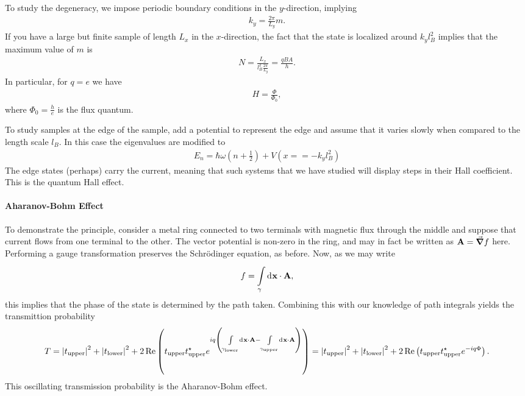 To study the degeneracy, we impose periodic boundary conditions in the $y$-direction, implying
\begin{align*}
	k_{y} = \frac{2\pi}{L_{y}}m.
\end{align*}
If you have a large but finite sample of length $L_{x}$ in the $x$-direction, the fact that the state is localized around $k_{y}l_{B}^{2}$ implies that the maximum value of $m$ is
\begin{align*}
	N = \frac{L_{x}}{l_{B}^{2}\frac{2\pi}{L_{y}}} = \frac{qBA}{h}.
\end{align*}
In particular, for $q = e$ we have
\begin{align*}
	H = \frac{\Phi}{\Phi_{0}},
\end{align*}
where $\Phi_{0} = \frac{h}{e}$ is the flux quantum.

To study samples at the edge of the sample, add a potential to represent the edge and assume that it varies slowly when compared to the length scale $l_{B}$. In this case the eigenvalues are modified to
\begin{align*}
	E_{n} = \hbar\omega(n + \frac{1}{2}) + V(x = = -k_{y}l_{B}^{2})
\end{align*}
The edge states (perhaps) carry the current, meaning that such systems that we have studied will display steps in their Hall coefficient. This is the quantum Hall effect.

\paragraph{Aharanov-Bohm Effect}
To demonstrate the principle, consider a metal ring connected to two terminals with magnetic flux through the middle and suppose that current flows from one terminal to the other. The vector potential is non-zero in the ring, and may in fact be written as $\vb{A} = \grad{f}$ here. Performing a gauge transformation preserves the Schrödinger equation, as before. Now, as we may write
\begin{align*}
	f = \int\limits_{\gamma}^{}\dd[]{\vb{x}}\cdot\vb{A},
\end{align*}
this implies that the phase of the state is determined by the path taken. Combining this with our knowledge of path integrals yields the transmittion probability
\begin{align*}
	T = \abs{t_{\text{upper}}}^{2} + \abs{t_{\text{lower}}}^{2} + 2\Re\left(t_{\text{upper}}t_{\text{upper}}^{\star}e^{iq\left(\int\limits_{\gamma_{\text{lower}}}^{}\dd[]{\vb{x}}\cdot\vb{A} - \int\limits_{\gamma_{\text{upper}}}^{}\dd[]{\vb{x}}\cdot\vb{A}\right)}\right) = \abs{t_{\text{upper}}}^{2} + \abs{t_{\text{lower}}}^{2} + 2\Re\left(t_{\text{upper}}t_{\text{upper}}^{\star}e^{-iq\Phi}\right).
\end{align*}
This oscillating transmission probability is the Aharanov-Bohm effect.